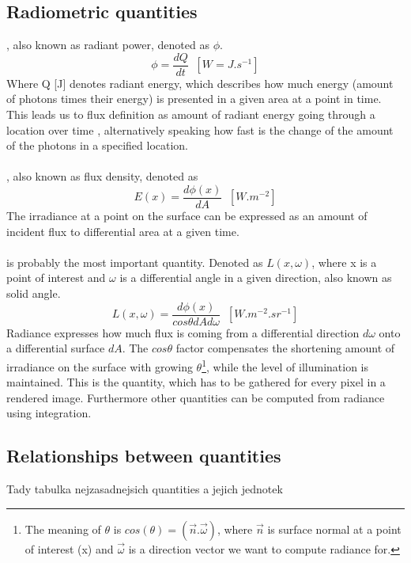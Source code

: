 \subsection{Radiometric quantities}
, also known as radiant power, denoted as $\phi$.
\begin{equation}
\phi=\frac{dQ}{dt}\;\;[W=J.s^{-1}]
\end{equation}
Where Q [J] denotes radiant energy, which describes how much energy (amount of photons times their energy) is presented in a given area at a point in time. This leads us to flux definition as  amount of radiant energy going through a location over time , alternatively speaking how fast is the change of the amount of the photons in a specified location. 
\\
\\
, also known as flux density, denoted as  
\begin{equation}
E(x)=\frac{d\phi(x)}{dA}\;\;[W.m^{-2}]
\end{equation}
The irradiance at a point  on the surface  can be expressed as an amount of incident flux to differential area at a given time.
\\
\\
 is probably the most important quantity. Denoted as $L(x,\omega)$, where x is a point of interest and $\omega$ is a differential angle in a given direction, also known as solid angle.
\begin{equation}
L(x,\omega)=\frac{d\phi(x)}{cos\theta dAd \omega}\;\;[W.m^{-2}.sr^{-1}]
\end{equation}
Radiance expresses how much flux is coming from a differential direction $d\omega$ onto a differential surface $dA$. The $cos\theta$ factor compensates the shortening amount of irradiance on the surface with growing $\theta$\footnote{The meaning of $\theta$ is $cos(\theta)=(\vec{n}.\vec{\omega})$, where $\vec{n}$ is surface normal at a point of interest (x) and $\vec{\omega}$ is a direction vector we want to compute radiance for.}, while the level of illumination is maintained. This is the quantity, which has to be gathered for every pixel in a rendered image. Furthermore other quantities can be computed from radiance using integration. 

\subsection{Relationships between quantities}
Tady tabulka nejzasadnejsich quantities a jejich jednotek 

